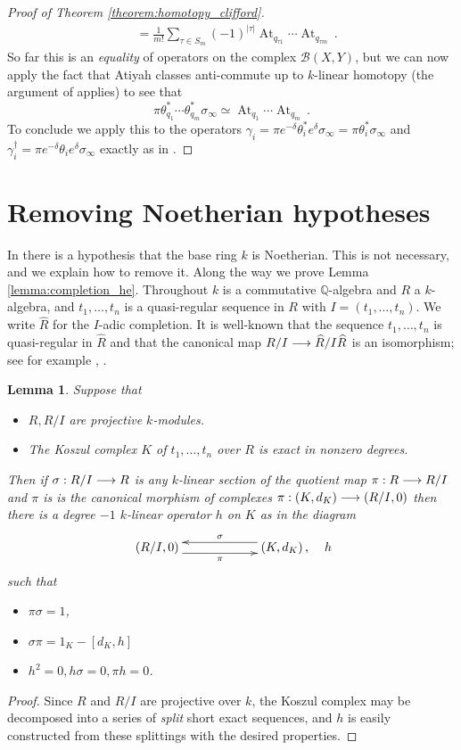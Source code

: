 \documentclass[english,letter paper,12pt,leqno]{article}
\newtheorem{lemma}[theorem]{Lemma}
\theoremstyle{example}
\numberwithin{equation}{section}
\def\BB{\mathcal{B}}
\DeclareMathOperator{\At}{At}
\begin{document}
\begin{proof}[Proof of Theorem \ref{theorem:homotopy_clifford}]
\begin{align*}
&= \frac{1}{m!} \sum_{\tau \in S_m} (-1)^{|\tau|} \At_{q_{\tau 1}} \cdots \At_{q_{\tau m}}\,.
\end{align*}
So far this is an \emph{equality} of operators on the complex $\BB(X,Y)$, but we can now apply the fact that Atiyah classes anti-commute up to $k$-linear homotopy (the argument of \cite[Theorem 3.11]{cut} applies) to see that
\[
\pi \theta_{q_1}^* \cdots \theta_{q_m}^* \sigma_\infty \simeq \At_{q_1} \cdots \At_{q_m}\,.
\]
To conclude we apply this to the operators $\gamma_i = \pi e^{-\delta} \theta_i^* e^\delta \sigma_\infty = \pi \theta_i^* \sigma_\infty$ and $\gamma_i^\dagger = \pi e^{-\delta} \theta_i e^\delta \sigma_\infty$ exactly as in \cite[Proposition 4.35]{cut}.
\end{proof}

\section{Removing Noetherian hypotheses}\label{section:noetherian}

In \cite{cut} there is a hypothesis that the base ring $k$ is Noetherian. This is not necessary, and we explain how to remove it. Along the way we prove Lemma \ref{lemma:completion_he}. Throughout $k$ is a commutative $\mathbb{Q}$-algebra and $R$ a $k$-algebra, and $t_1,\ldots,t_n$ is a quasi-regular sequence in $R$ with $I = (t_1,\ldots,t_n)$. We write $\widehat{R}$ for the $I$-adic completion. It is well-known that the sequence $t_1,\ldots,t_n$ is quasi-regular in $\widehat{R}$ and that the canonical map $R/I \longrightarrow \widehat{R}/I\widehat{R}$ is an isomorphism; see for example \cite[\S 15.B]{matsumura}, \cite[Chapitre $0$ \S 15.1]{EGA4}.

\begin{lemma}\label{lemma:trivialsplit} Suppose that
\begin{itemize}
\item[(i)] $R, R/I$ are projective $k$-modules.
\item[(ii)] The Koszul complex $K$ of $t_1,\ldots,t_n$ over $R$ is exact in nonzero degrees.
\end{itemize}
Then if $\sigma: R/I \longrightarrow R$ is any $k$-linear section of the quotient map $\pi: R \longrightarrow R/I$ and $\pi$ is is the canonical morphism of complexes $\pi: (K,d_K) \longrightarrow (R/I,0)$ then there is a degree $-1$ $k$-linear operator $h$ on $K$ as in the diagram
\[
\xymatrix@C+3pc{
(R/I,0) \ar@<-1ex>[r]_-\pi & (K,d_K)\,, \ar@<-1ex>[l]_-\sigma
}\quad h
\]
such that
\begin{itemize}
\item $\pi \sigma = 1$,
\item $\sigma \pi = 1_K - [d_K, h]$
\item $h^2 = 0, h\sigma = 0, \pi h = 0$.
\end{itemize}
\end{lemma}
\begin{proof}
Since $R$ and $R/I$ are projective over $k$, the Koszul complex may be decomposed into a series of \emph{split} short exact sequences, and $h$ is easily constructed from these splittings with the desired properties.
\end{proof}
\end{document}
